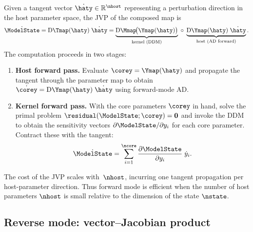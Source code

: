 Given a tangent vector $\dot{\haty} \in \mathbb{R}^{\nhost}$
representing a perturbation direction in the host parameter space, the
JVP of the composed map is
\begin{equation}\label{eq:jvp}
    \dot{\ModelState}
    = \mathrm{D}\Tmap(\haty)\;\dot{\haty}
    = \underbrace{%
        \mathrm{D}\Mmap\!\bigl(\Ymap(\haty)\bigr)
      }_{\text{kernel (DDM)}}
      \;\circ\;
      \underbrace{%
        \mathrm{D}\Ymap(\haty)\;\dot{\haty}
      }_{\text{host (AD forward)}}.
\end{equation}
The computation proceeds in two stages:
\begin{enumerate}
    \item \textbf{Host forward pass.}  Evaluate
          $\corey = \Ymap(\haty)$ and propagate the tangent through
          the parameter map to obtain
          $\dot{\corey} = \mathrm{D}\Ymap(\haty)\;\dot{\haty}$ using
          forward-mode AD.
    \item \textbf{Kernel forward pass.}  With the core parameters
          $\corey$ in hand, solve the primal problem
          $\residual(\ModelState;\corey)=\mathbf{0}$ and invoke the DDM to
          obtain the sensitivity vectors
          $\partial\ModelState/\partial y_i$ for each core parameter.
          Contract these with the tangent:
          \begin{equation}\label{eq:jvp-contract}
              \dot{\ModelState}
              = \sum_{i=1}^{\ncore}
                \frac{\partial\ModelState}{\partial y_i}\;\dot{y}_i.
          \end{equation}
\end{enumerate}

The cost of the JVP scales with~$\nhost$, incurring one tangent propagation per
host-parameter direction. Thus forward mode is efficient when the number of host parameters \(\nhost\) is small relative to the dimension of the state \(\nstate\).


\subsection{Reverse mode: vector--Jacobian product}


